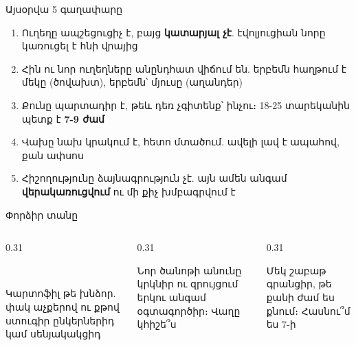 \notopic

\begin{frame}{Այսօրվա 5 գաղափարը}
  \begin{enumerate}
    \item<1-> Ուղեղը ապշեցուցիչ է, բայց \textbf{կատարյալ չէ}. էվոլյուցիան նորը կառուցել է հնի վրայից
    \item<2-> Հին ու նոր ուղեղները անընդհատ վիճում են. երբեմն հաղթում է մեկը (ծովախտ), երբեմն՝ մյուսը (աղանդեր)
    \item<3-> Քունը պարտադիր է, թեև դեռ չգիտենք՝ ինչու։ 18-25 տարեկանին պետք է \textbf{7-9 ժամ}
    \item<4-> Վախը նախ կրակում է, հետո մտածում. ավելի լավ է ապահով, քան ափսոս
    \item<5-> Հիշողությունը ձայնագրություն չէ. այն ամեն անգամ \textbf{վերակառուցվում} ու մի քիչ խմբագրվում է
  \end{enumerate}
\end{frame}

\begin{frame}{Փորձիր տանը}
  \begin{columns}[T]
    \begin{column}{0.31\textwidth}
      \begin{card}[colback=mint!30!cardwhite]
        \centering{}\ \par\smallskip
        \raggedright Կարտոֆիլ թե խնձոր. փակ աչքերով ու քթով ստուգիր ընկերներիդ կամ սենյակակցիդ
      \end{card}
    \end{column}
    \begin{column}{0.31\textwidth}
      \begin{card}[colback=lavender!35!cardwhite]
        \centering{}\par\smallskip
        \raggedright Նոր ծանոթի անունը կրկնիր ու զրույցում երկու անգամ օգտագործիր։ Վաղը կհիշե՞ս
      \end{card}
    \end{column}
    \begin{column}{0.31\textwidth}
      \begin{card}[colback=peach!35!cardwhite]
        \centering{}\par\smallskip
        \raggedright Մեկ շաբաթ գրանցիր, թե քանի ժամ ես քնում։ Հասնու՞մ ես 7-ի
      \end{card}
    \end{column}
  \end{columns}
\end{frame}

